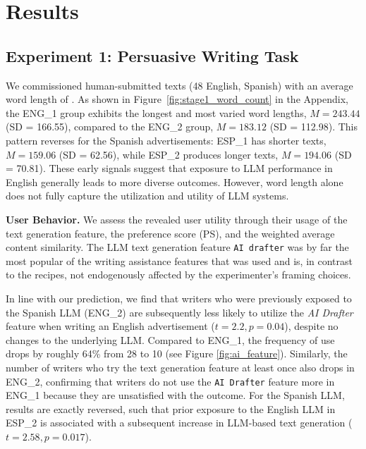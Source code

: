 \section{Results}

\subsection{Experiment 1: Persuasive Writing Task}
We commissioned  human-submitted texts (48 English,  Spanish) with an average word length of . As shown in Figure~\ref{fig:stage1_word_count} in the Appendix, the ENG\_1 group exhibits the longest and most varied word lengths, $M = 243.44$ (SD = 166.55), compared to the ENG\_2 group, $M = 183.12$ (SD = 112.98). This pattern reverses for the Spanish advertisements: ESP\_1 has shorter texts, $M = 159.06$ (SD = 62.56), while ESP\_2 produces longer texts, $M = 194.06$ (SD = 70.81). These early signals suggest that exposure to LLM performance in English generally leads to more diverse outcomes. However, word length alone does not fully capture the utilization and utility of LLM systems.


\textbf{User Behavior.} We assess the revealed user utility through their usage of the text generation feature, the preference score (PS), and the weighted average content similarity. The LLM text generation feature \texttt{AI drafter} was by far the most popular of the writing assistance features that was used and is, in contrast to the recipes, not endogenously affected by the experimenter's framing choices. 


In line with our prediction, we find that writers who were previously exposed to the Spanish LLM (ENG\_2) are subsequently less likely to utilize the  \textit{AI Drafter} feature when writing an English advertisement ($t = 2.2, p = 0.04$), despite no changes to the underlying LLM. Compared to ENG\_1, the frequency of use drops by roughly 64\% from 28 to 10 (see Figure \ref{fig:ai_feature}). Similarly, the number of writers who try the text generation feature at least once also drops in ENG\_2, confirming that writers do not use the \texttt{AI Drafter} feature more in ENG\_1 because they are unsatisfied with the outcome.  
%
For the Spanish LLM, results are exactly reversed, such that prior exposure to the English LLM in ESP\_2 is associated with a subsequent increase in LLM-based text generation ($t = 2.58, p = 0.017$).

